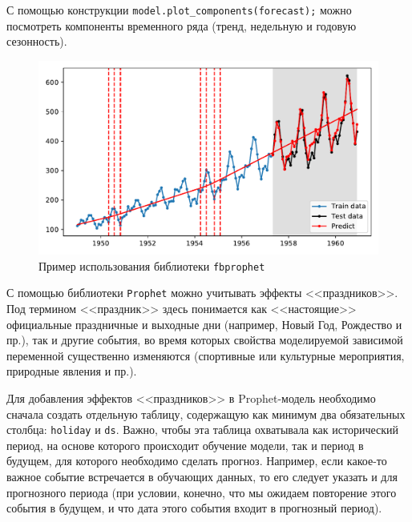 \documentclass[%
	11pt,
	a4paper,
	utf8,
		]{article}
\begin{document}
С помощью конструкции \lstinline{model.plot_components(forecast);} можно посмотреть компоненты временного ряда (тренд, недельную и годовую сезонность).

\begin{figure}[h]
	\centering
	\includegraphics[scale=0.65]{figures/prophet_test.pdf}
	\caption{Пример использования библиотеки \texttt{fbprophet}}\label{fig:prophet_test}
\end{figure}

С помощью библиотеки \texttt{Prophet} можно учитывать эффекты <<праздников>>. Под термином <<праздник>> здесь понимается как <<настоящие>> официальные праздничные и выходные дни (например, Новый Год, Рождество и пр.), так и другие события, во время которых свойства моделируемой зависимой переменной существенно изменяются (спортивные или культурные мероприятия, природные явления и пр.).

Для добавления эффектов <<праздников>> в Prophet-модель необходимо сначала создать отдельную таблицу, содержащую как минимум два обязательных столбца: \texttt{holiday} и \texttt{ds}. Важно, чтобы эта таблица охватывала как исторический период, на основе которого происходит обучение модели, так и период в будущем, для которого необходимо сделать прогноз. Например, если какое-то важное событие встречается в обучающих данных, то его следует указать и для прогнозного периода (при условии, конечно, что мы ожидаем повторение этого события в будущем, и что дата этого события входит в прогнозный период).
\end{document}
